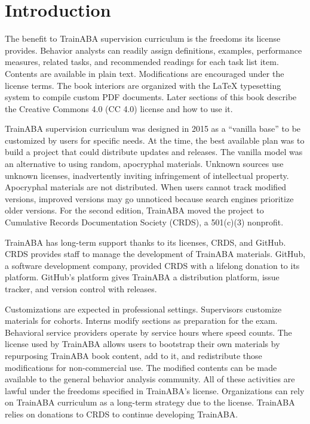 %
%
%
\chapter{Introduction}

The benefit to TrainABA supervision curriculum is the freedoms its license provides. Behavior analysts can readily assign definitions, examples, performance measures, related tasks, and recommended readings for each task list item. Contents are available in plain text. Modifications are encouraged under the license terms. The book interiors are organized with the \LaTeX{} typesetting system to compile custom PDF documents. Later sections of this book describe the Creative Commons 4.0 (CC 4.0) license and how to use it. 

TrainABA supervision curriculum was designed in 2015 as a ``vanilla base''  to be customized by users for specific needs. At the time, the best available plan was to build a project that could distribute updates and releases. The vanilla model was an alternative to using random, apocryphal materials. Unknown sources use unknown licenses, inadvertently inviting infringement of intellectual property. Apocryphal materials are not distributed. When users cannot track modified versions, improved versions may go unnoticed because search engines prioritize older versions. For the second edition, TrainABA moved the project to Cumulative Records Documentation Society (CRDS), a 501(c)(3) nonprofit. 

TrainABA has long-term support thanks to its licenses, CRDS, and GitHub. CRDS provides staff to manage the development of TrainABA materials. GitHub, a software development company, provided CRDS with a lifelong donation to its platform. GitHub's platform gives TrainABA a distribution platform, issue tracker, and version control with releases.

Customizations are expected in professional settings. Supervisors customize materials for cohorts. Interns modify sections as preparation for the exam. Behavioral service providers operate by service hours where speed counts. The license used by TrainABA allows users to bootstrap their own materials by repurposing TrainABA book content, add to it, and redistribute those modifications for non-commercial use. The modified contents can be made available to the general behavior analysis community. All of these activities are lawful under the freedoms specified in TrainABA's license. Organizations can rely on TrainABA curriculum as a long-term strategy due to the license. TrainABA relies on donations to CRDS to continue developing TrainABA. 

